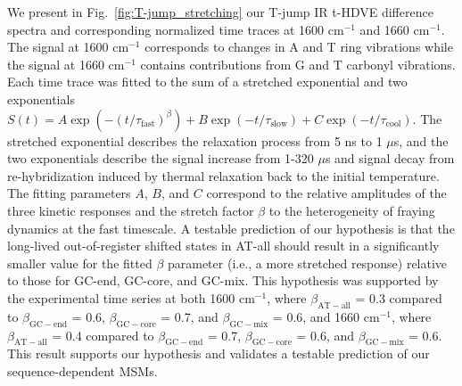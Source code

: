 \documentclass[journal=jpcbfk,manuscript=article]{achemso}
\begin{document}
We present in Fig.~\ref{fig:T-jump_stretching} our T-jump IR t-HDVE difference spectra and corresponding normalized time traces at 1600 cm$^{-1}$ and 1660 cm$^{-1}$. The signal at 1600 cm$^{-1}$ corresponds to changes in A and T ring vibrations while the signal at 1660 cm$^{-1}$ contains contributions from G and T carbonyl vibrations. Each time trace was fitted to the sum of a stretched exponential and two exponentials $S(t) = A\exp{(-(t/\tau_{\mathrm{fast}})^{\beta})} + B\exp{(-t/\tau_{\mathrm{slow}})}+C\exp{(-t/\tau_{\mathrm{cool}})}$. The stretched exponential describes the relaxation process from 5 ns to 1 $\mu$s, and the two exponentials describe the signal increase from 1-320 $\mu$s and signal decay from re-hybridization induced by thermal relaxation back to the initial temperature. The fitting parameters $A$, $B$, and $C$ correspond to the relative amplitudes of the three kinetic responses and the stretch factor $\beta$ to the heterogeneity of fraying dynamics at the fast timescale. A testable prediction of our hypothesis is that the long-lived out-of-register shifted states in AT-all should result in a significantly smaller value for the fitted $\beta$ parameter (i.e., a more stretched response) relative to those for GC-end, GC-core, and GC-mix. This hypothesis was supported by the experimental time series at both 1600 cm$^{-1}$, where $\beta_\mathrm{AT-all}$ = 0.3 compared to $\beta_\mathrm{GC-end}$ = 0.6, $\beta_\mathrm{GC-core}$ = 0.7, and $\beta_\mathrm{GC-mix}$ = 0.6, and 1660 cm$^{-1}$, where $\beta_\mathrm{AT-all}$ = 0.4 compared to $\beta_\mathrm{GC-end}$ = 0.7, $\beta_\mathrm{GC-core}$ = 0.6, and $\beta_\mathrm{GC-mix}$ = 0.6. This result supports our hypothesis and validates a testable prediction of our sequence-dependent MSMs.  

\end{document}
